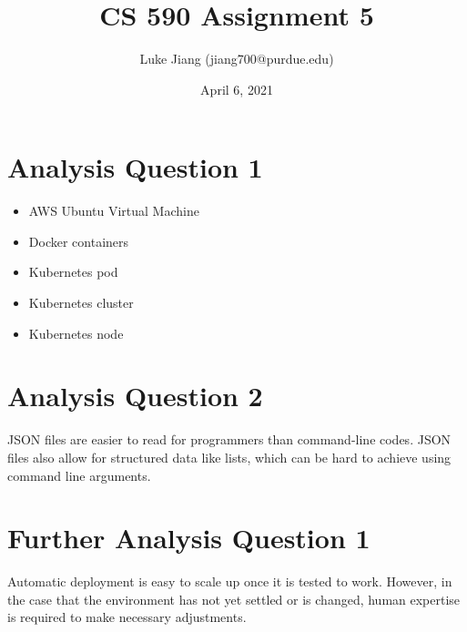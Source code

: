 \documentclass{article}
\title{CS 590 Assignment 5}
\author{Luke Jiang (jiang700@purdue.edu) }
\date{April 6, 2021}
\begin{document}
\maketitle

\section{Analysis Question 1}
\begin{itemize}
    \item AWS Ubuntu Virtual Machine
    \item Docker containers
    \item Kubernetes pod
    \item Kubernetes cluster
    \item Kubernetes node
\end{itemize}

\section{Analysis Question 2}
JSON files are easier to read for programmers than command-line codes. JSON files also allow for structured data like lists, which can be hard to achieve using command line arguments.

\section{Further Analysis Question 1}
Automatic deployment is easy to scale up once it is tested to work. However, in the case that the environment has not yet settled or is changed, human expertise is required to make necessary adjustments.
\end{document}
